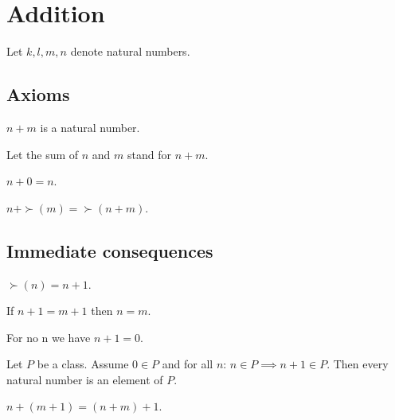 \documentclass[../../natural-numbers.ftl.tex]{subfiles}
\begin{document}
  \section{Addition}

  \begin{forthel}
  \end{forthel}

  \begin{forthel}
    Let $k, l, m, n$ denote natural numbers.
  \end{forthel}


  \subsection{Axioms}

  \begin{forthel}
    \begin{signature}
      $n + m$ is a natural number.
    \end{signature}

    Let the sum of $n$ and $m$ stand for $n + m$.

    \begin{axiom}
      $n + 0 = n$.
    \end{axiom}

    \begin{axiom}
      $n + \succ(m) = \succ(n + m)$.
    \end{axiom}
  \end{forthel}


  \subsection{Immediate consequences}

  \begin{forthel}
    \begin{lemma}
      $\succ(n) = n + 1$.
    \end{lemma}

    \begin{corollary}
      If $n + 1 = m + 1$ then $n = m$.
    \end{corollary}

    \begin{corollary}
      For no n we have $n + 1 = 0$.
    \end{corollary}

    \begin{corollary}
      Let $P$ be a class.
      Assume $0 \in P$ and for all $n$: $n \in P \implies n + 1 \in P$.
      Then every natural number is an element of $P$.
    \end{corollary}

    \begin{corollary}
      $n + (m + 1) = (n + m) + 1$.
    \end{corollary}
  \end{forthel}
\end{document}
